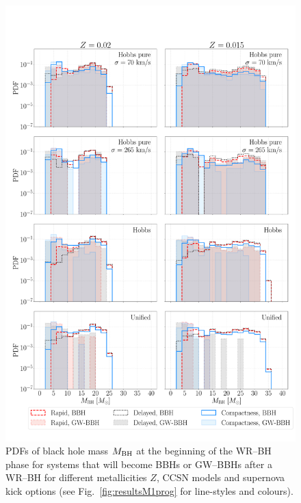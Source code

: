 \documentclass[a4paper,titlepage]{book}     	%
\begin{document}
\begin{figure}[h!]
	\centering
	\includegraphics[width=\textwidth]{./images/WRBH-MBH.pdf}	
	\caption{PDFs of black hole mass $M_{\rm BH}$ at the beginning of the WR--BH phase for systems that will become BBHs or GW--BBHs after a WR--BH for different metallicities $Z$, CCSN models and supernova kick options (see Fig.\ \ref{fig:resultsM1prog} for line-styles and colours).}\label{fig:resultsWRBH-MBH}
\end{figure}
\end{document}
